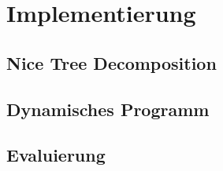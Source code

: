%
%
%
\chapter{Implementierung}
\label{c:impl} %

\section{Nice Tree Decomposition}
\label{sec:impl_ntd}

\section{Dynamisches Programm}
\label{sec:impl_dynP}

\section{Evaluierung}
\label{sec:eval}
